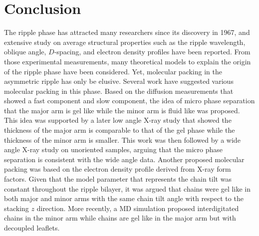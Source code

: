 \newpage
\section{Conclusion}\label{sec:ripple_conclusion}
The ripple phase has attracted many researchers since its discovery in 1967,
and extensive study on average structural properties such as 
the ripple wavelength, oblique angle, $D$-spacing, and electron density
profiles have been reported. From those experimental measurements, 
many theoretical models to explain the origin of the ripple phase have 
been considered. Yet, molecular packing in the asymmetric
ripple has only be elusive. 
Several work have suggested various molecular packing in this phase.
Based on the diffusion measurements that showed a fast component and
slow component, the idea of micro phase separation that the major arm
is gel like while the minor arm is fluid like was proposed. This idea
was supported by a later low angle X-ray study that showed the thickness of the major arm
is comparable to that of the gel phase while the thickness of the minor
arm is smaller. This work was then followed by a wide angle X-ray study on
unoriented samples, arguing that the micro phase separation is consistent 
with the wide angle data.
Another proposed molecular packing was based on the electron density profile
derived from X-ray form factors. Given that the model parameter that represents
the chain tilt was constant throughout the ripple bilayer, it was argued 
that chains were gel like in both major and minor arms with the same 
chain tilt angle with respect to the stacking $z$ direction.
More recently, a MD simulation proposed interdigitated chains in the minor 
arm while chains are gel like in the major arm but with decoupled leaflets.

